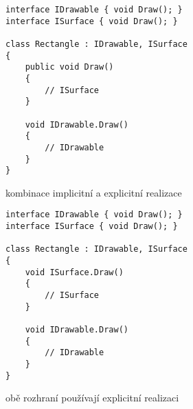 \begin{frame}[fragile]
\begin{yesblock}
\begin{lstlisting}
interface IDrawable { void Draw(); }
interface ISurface { void Draw(); }

class Rectangle : IDrawable, ISurface
{
    public void Draw()
    {
        // ISurface
    }

    void IDrawable.Draw()
    {
        // IDrawable
    }
}
\end{lstlisting}
\end{yesblock}
\vfill
\begin{bitemize}{}
\item kombinace implicitní a explicitní realizace
\end{bitemize}
\end{frame}




\begin{frame}[fragile]
\begin{yesblock}
\begin{lstlisting}
interface IDrawable { void Draw(); }
interface ISurface { void Draw(); }

class Rectangle : IDrawable, ISurface
{
    void ISurface.Draw()
    {
        // ISurface
    }

    void IDrawable.Draw()
    {
        // IDrawable
    }
}
\end{lstlisting}
\end{yesblock}
\vfill
\begin{bitemize}{}
\item obě rozhraní používají explicitní realizaci
\end{bitemize}
\end{frame}










